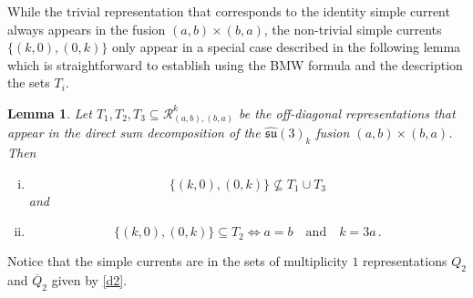 \documentclass[a4paper,11pt]{article}
\theoremstyle{plain}
\newtheorem{lemma}[thm]{Lemma}
\theoremstyle{definition}
\newcommand{\mycomment}[1]{}
\newcommand{\aff}{\widehat{\mathfrak{su}}(3)_k}
\begin{document}
While the trivial representation that corresponds to the identity simple current always appears in the fusion $(a,b)\times (b,a)$, the non-trivial 
simple currents $\{(k,0),(0,k)\}$ only appear in a special case described in the following lemma which is straightforward to establish using the BMW formula and 
the description the sets $T_{i}$. 
\begin{lemma}\label{lemma2}
    Let $T_1,T_2,T_3 \subseteq \mathcal{R}_{(a,b),(b,a)}^k$ be the off-diagonal representations that appear in the direct sum decomposition of the  $\aff$ fusion $(a,b)\times (b,a)$. Then 
   \begin{enumerate}[i),wide, labelwidth=!, labelindent=0pt]\item \begin{equation}
        \{(k,0),(0,k)\}  \nsubseteq T_1\cup T_3
    \end{equation}
    and \item
    \begin{equation}
          \{(k,0),(0,k)\}  \subseteq T_2 \Longleftrightarrow a=b \quad \text{and}\quad k=3a \, .
    \end{equation}
    \end{enumerate}
\end{lemma}
Notice that the simple currents are in the sets of multiplicity $1$ representations $Q_2$ and $\overline{Q}_2$ given by \eqref{d2}.

\mycomment{
It will be convenient to isolate the simple currents. To achieve this we split $D_2$ according to the level $k$ as
 \begin{align}\label{d2low}
        &b\geq 1, \quad a+b+1\leq k\leq a+2b-1 \nonumber \\
        &D_2^{\text{low}}=\bigg\{(k-a-2l,k-a+l)\,|\, \operatorname{max}(1,k-2a)\leq l\leq k-a-b\bigg\}
    \end{align}
    and
     \begin{align}\label{d2high}
        &b\geq 1, \quad a+2b\leq k\leq 2a+b \nonumber \\
        &D_2^{\text{high}}=\bigg\{(k-a-2l,k-a+l)\,|\, \operatorname{max}(1,k-2a)\leq l\leq b\bigg\}\,.
    \end{align}
In this way we see that whenever the simple currents $(0,k)$ and $(k,0)$ appear in the fusion $(a,b)\times (b,a)$ they will be the only elements of the sets $D_2^{\text{high}}$ and $\overline{D}_2^{\text{high}}$ respectively.
}
\end{document}
